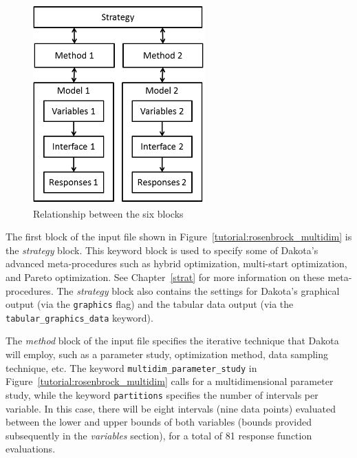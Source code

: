 \begin{figure}[ht!]
  \centering
  \includegraphics[height=3in]{images/inputfile_block_layout}
  \caption{Relationship between the six blocks}
  \label{tutorial:inputfile_block_layout}
\end{figure}

The first block of the input file shown in
Figure~\ref{tutorial:rosenbrock_multidim} is the \emph{strategy} block.
This keyword block is used to specify some of Dakota's advanced
meta-procedures such as hybrid optimization, 
multi-start optimization, and Pareto optimization.
See Chapter~\ref{strat} for more information on these
meta-procedures. The \emph{strategy} block also contains the
settings for Dakota's graphical output (via the \texttt{graphics}
flag) and the tabular data output (via the
\texttt{tabular\_graphics\_data} keyword).

The \emph{method} block of the input file specifies the iterative
technique that Dakota will employ, such as a parameter study,
optimization method, data sampling technique, etc.
The keyword \texttt{multidim\_parameter\_study}
in Figure~\ref{tutorial:rosenbrock_multidim} calls for a multidimensional
parameter study, while the keyword \texttt{partitions} specifies the
number of intervals per variable. In this case, there will be eight
intervals (nine data points) evaluated between the lower and upper
bounds of both variables (bounds provided subsequently in the
\emph{variables} section), for a total of 81 response function
evaluations.


